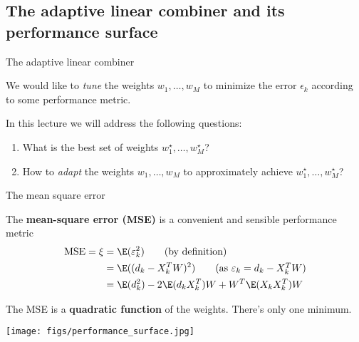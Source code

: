 \documentclass[10pt, aspectratio=169]{beamer}
\begin{document}
\subsection{The adaptive linear combiner and its performance surface}
\begin{frame}{The adaptive linear combiner}

\begin{center}
	\resizebox{0.7\textwidth}{!}{}
\end{center}

We would like to \textit{tune} the weights $w_1, \ldots, w_M$ to minimize the error $\epsilon_k$ according to some performance metric.

In this lecture we will address the following questions:
\begin{enumerate}
	\item What is the best set of weights $w^\star_1, \ldots, w^\star_M$? 
	\item How to \textit{adapt} the weights $w_1, \ldots, w_M$ to approximately achieve $w^\star_1, \ldots, w^\star_M$?
\end{enumerate}

\end{frame}

%
\begin{frame}{The mean square error}

The \textbf{mean-square error (MSE)} is a convenient and sensible performance metric
\begin{align*}
\mathrm{MSE} = \xi &= \E(\varepsilon_k^2) \tag{by definition} \\
&= \E((d_k - X_k^TW)^2) \tag{as $\varepsilon_k = d_k - X_k^TW$} \\
&= \E(d^2_k) - 2\E(d_kX_k^T)W + W^T\E(X_kX_k^T)W 
\end{align*}

The MSE is a \textbf{quadratic function} of the weights. There's only one minimum.

\begin{center}
	\texttt{[image: figs/performance\_surface.jpg]}	
\end{center}

\end{frame}
\end{document}
